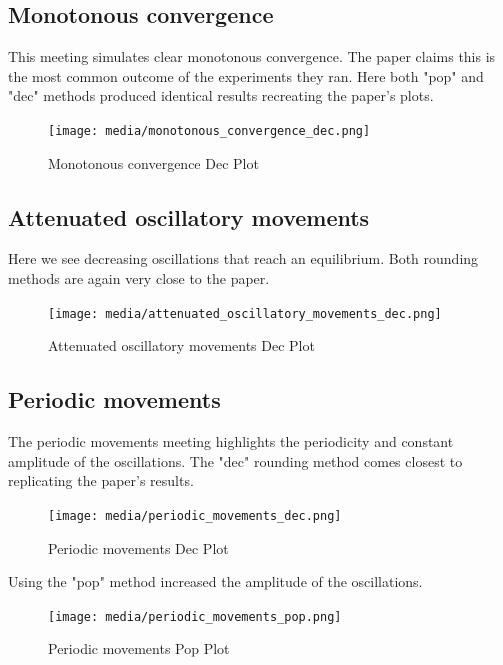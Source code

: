 \documentclass[12pt]{article}
\begin{document}
\subsection{Monotonous convergence}
This meeting simulates clear monotonous convergence. The paper claims this is the most common outcome of the experiments they ran. Here both "pop" and "dec" methods produced identical results recreating the paper's plots. 
\begin{figure}[H]
    \centering
    \texttt{[image: media/monotonous\_convergence\_dec.png]}
    \caption{Monotonous convergence Dec Plot}
\end{figure}

\subsection{Attenuated oscillatory movements}
Here we see decreasing oscillations that reach an equilibrium. Both rounding methods are again very close to the paper.
\begin{figure}[H]
    \centering
    \texttt{[image: media/attenuated\_oscillatory\_movements\_dec.png]}
    \caption{Attenuated oscillatory movements Dec Plot}
\end{figure}

\subsection{Periodic movements}
The periodic movements meeting highlights the periodicity and constant amplitude of the oscillations. The "dec" rounding method comes closest to replicating the paper's results.
\begin{figure}[H]
    \centering
    \texttt{[image: media/periodic\_movements\_dec.png]}
    \caption{Periodic movements Dec Plot}
\end{figure}
Using the "pop" method increased the amplitude of the oscillations.
\begin{figure}[H]
    \centering
    \texttt{[image: media/periodic\_movements\_pop.png]}
    \caption{Periodic movements Pop Plot}
\end{figure}
\end{document}
